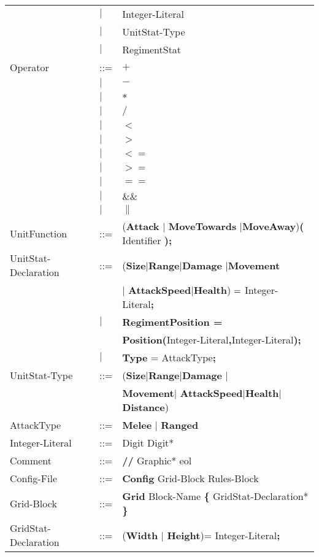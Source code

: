 \begin{center}
\begin{longtable}{ l l l }
									&$\mid$	&Integer-Literal \\
									&$\mid$	&UnitStat-Type\\
									&$\mid$	&RegimentStat \\	
		Operator					&	::=	&$\boldsymbol {+}$\\
									&$\mid$	&$\boldsymbol {-}$\\
									&$\mid$	&$\boldsymbol {*}$\\
									&$\mid$	&$\boldsymbol {/}$\\
									&$\mid$	&$\boldsymbol {<}$\\
									&$\mid$	&$\boldsymbol {>}$\\
									&$\mid$	&$\boldsymbol {<=}$\\
									&$\mid$	&$\boldsymbol {>=}$\\
									&$\mid$	&$\boldsymbol {==}$\\
									&$\mid$	&$\boldsymbol {\&\&}$\\
									&$\mid$	&$\boldsymbol {\|}$\\
		UnitFunction				&	::=	&({\bf Attack} $\mid$ {\bf MoveTowards} $\mid${\bf MoveAway}){\bf (} Identifier {\bf );}\\
		UnitStat-Declaration		&	::=	&({\bf Size}$\mid${\bf Range}$\mid${\bf Damage} $\mid${\bf Movement}\\ 
									&		&$\mid$ {\bf AttackSpeed}$\mid${\bf Health}) ${\bf = }$ Integer-Literal{\bf ;} \\
									&$\mid$	&{\bf RegimentPosition =} \\
									&		&{\bf Position(}Integer-Literal{\bf ,}Integer-Literal{\bf );}\\
									&$\mid$	&{\bf Type} = AttackType{\bf ;}\\
		UnitStat-Type				&	::=	&({\bf Size}$\mid${\bf Range}$\mid${\bf Damage} $\mid$\\
									&		&{\bf Movement}$\mid$ {\bf AttackSpeed}$\mid${\bf Health}$\mid${\bf Distance})\\ 
		AttackType					&	::=	&{\bf Melee} $\mid$ {\bf Ranged} \\
		Integer-Literal				&	::=	&Digit Digit*\\
		Comment						&	::=	&{\bf //} Graphic* eol\\
		Config-File					&	::=	&{\bf Config} Grid-Block Rules-Block  		\\
		Grid-Block					&	::=	&{\bf Grid} Block-Name	 {\bf \{} GridStat-Declaration* \bf{\}} \\
		GridStat-Declaration		&	::=	&({\bf Width} $\mid$ {\bf Height})=  Integer-Literal{\bf ;} \\	

\end{longtable}
\end{center}
